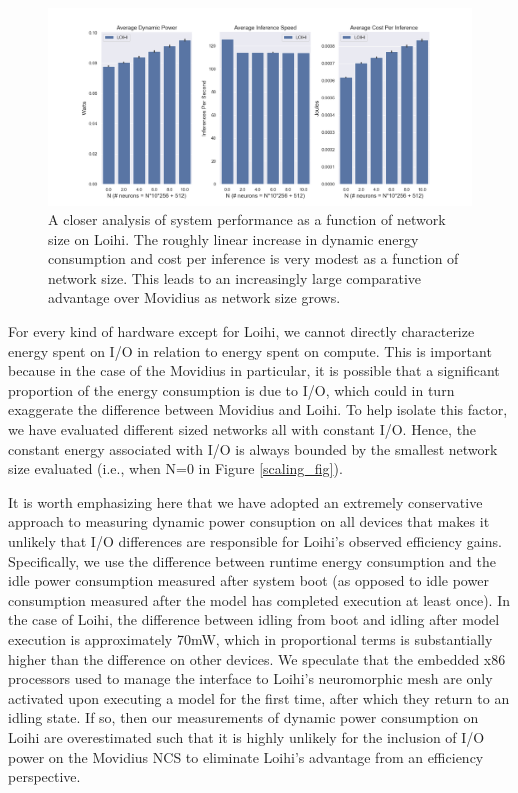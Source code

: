 \documentclass[sigconf, screen]{acmart}
\begin{document}
\begin{figure}[ht!]
\centering
    \includegraphics[width=6.7in]{./figures/loihi_summary.png}
    \caption{A closer analysis of system performance as a function of network size on Loihi. The roughly linear increase in dynamic energy consumption and cost per inference is very modest as a function of network size. This leads to an increasingly large comparative advantage over Movidius as network size grows.}
\label{loihi_fig}
\end{figure}

For every kind of hardware except for Loihi, we cannot directly characterize energy spent on I/O in relation to energy spent on compute. This is important because in the case of the Movidius in particular, it is possible that a significant proportion of the energy consumption is due to I/O, which could in turn exaggerate the difference between Movidius and Loihi. To help isolate this factor, we have evaluated different sized networks all with constant I/O. Hence, the constant energy associated with I/O is always bounded by the smallest network size evaluated (i.e., when N=0 in Figure \ref{scaling_fig}).

It is worth emphasizing here that we have adopted an extremely conservative approach to measuring dynamic power consuption on all devices that makes it unlikely that I/O differences are responsible for Loihi's observed efficiency gains. Specifically, we use the difference between runtime energy consumption and the idle power consumption measured after system boot (as opposed to idle power consumption measured after the model has completed execution at least once). In the case of Loihi, the difference between idling from boot and idling after model execution is approximately 70mW, which in proportional terms is substantially higher than the difference on other devices. We speculate that the embedded x86 processors used to manage the interface to Loihi's neuromorphic mesh are only activated upon executing a model for the first time, after which they return to an idling state. If so, then our measurements of dynamic power consumption on Loihi are overestimated such that it is highly unlikely for the inclusion of I/O power on the Movidius NCS to eliminate Loihi's advantage from an efficiency perspective. 
\end{document}
